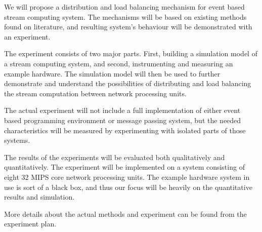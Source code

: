 We will propose a distribution and load balancing mechanism for event based stream computing system. The mechanisms will be based on existing methods found on literature, and resulting system's behaviour will be demonstrated with an experiment.

The experiment consists of two major parts. First, building a simulation model of a stream computing system, and second, instrumenting and measuring an example hardware. The simulation model will then be used to further demonstrate and understand the possibilities of distributing and load balancing the stream computation between network processing units.

The actual experiment will not include a full implementation of either event based programming environment or message passing system, but the needed characteristics will be measured by experimenting with isolated parts of those systems.

The results of the experiments will be evaluated both qualitatively and quantitatively. The experiment will be implemented on a system consisting of eight 32 MIPS core network processing units. The example hardware system in use is sort of a black box, and thus our focus will be heavily on the quantitative results and simulation.

More details about the actual methods and experiment can be found from the experiment plan.

